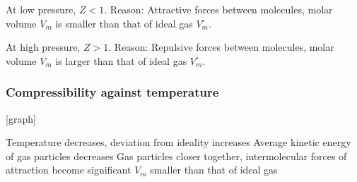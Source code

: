 At low pressure, $Z<1$. Reason: Attractive forces between molecules, molar volume $V_m$ is smaller than that of ideal gas $V_m^\circ$.

At high pressure, $Z>1$. Reason: Repulsive forces between molecules, molar volume $V_m$ is larger than that of ideal gas $V_m^\circ$.

\subsubsection{Compressibility against temperature}
[graph]

Temperature decreases, deviation from ideality increases
Average kinetic energy of gas particles decreases
Gas particles closer together, intermolecular forces of attraction become significant 
$V_m$ smaller than that of ideal gas

\pagebreak

